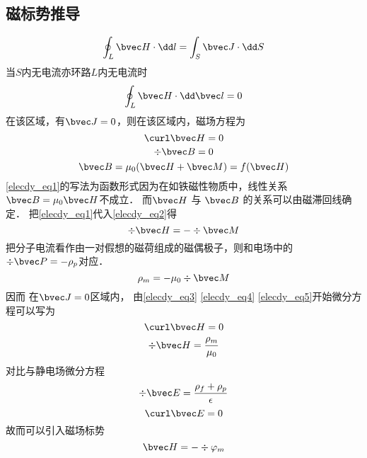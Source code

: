 
\subsection{磁标势推导}
\begin{equation}
\oint_L \bvec H \cdot \dd  l = \int_S \bvec J \cdot \dd S

\end{equation}当$S$内无电流亦环路$L$内无电流时
\begin{equation}
\oint_ L\bvec H \cdot \dd \bvec l = 0
\end{equation}
在该区域，有$\bvec J=0$，则在该区域内，磁场方程为 
\begin{equation}\label{elecdy_eq3}
\curl \bvec H =0
\end{equation}
\begin{equation}\label{elecdy_eq2}
\div \bvec B=0
\end{equation}
\begin{equation}\label{elecdy_eq1}
\bvec B=\mu_0(\bvec H+\bvec M)=f(\bvec H)
\end{equation}
\autoref{elecdy_eq1}的写法为函数形式因为在如铁磁性物质中，线性关系$\bvec B=\mu_0 \bvec H$不成立．
而$\bvec H$ 与 $\bvec B$ 的关系可以由磁滞回线确定．
把\autoref{elecdy_eq1}代入\autoref{elecdy_eq2}得
\begin{equation}\label{elecdy_eq4}
\div \bvec H= - \div \bvec M
\end{equation}
把分子电流看作由一对假想的磁荷组成的磁偶极子，则和电场中的$\div \bvec P=-\rho _p$对应．
\begin{equation}\label{elecdy_eq5}
\rho_m=-\mu_0 \div \bvec M
\end{equation}
因而 在$\bvec J=0$区域内， 由\autoref{elecdy_eq3} \autoref{elecdy_eq4} \autoref{elecdy_eq5}开始微分方程可以写为
\begin{equation}
\curl \bvec H=0 
\end{equation}
\begin{equation}
\div \bvec H= \dfrac{\rho_m}{\mu_0}
\end{equation}
对比与静电场微分方程
\begin{equation}
\div \bvec E=\dfrac{\rho_f+\rho_p}{\epsilon}
\end{equation}
\begin{equation}
\curl \bvec E=0
\end{equation}
故而可以引入磁场标势
\begin{equation}
\bvec H=-\div \varphi_m
\end{equation}

